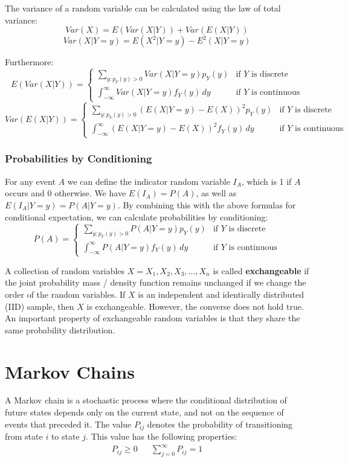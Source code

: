 \documentclass[12pt]{article}
\begin{document}
\newpage
\noindent
The variance of a random variable can be calculated using the law of total variance:
\[ Var(X) = E(Var(X|Y)) + Var(E(X|Y)) \]
\[ Var(X|Y = y) = E(X^2|Y = y) - E^2(X|Y = y) \]

\noindent
Furthermore:
\[ E(Var(X|Y)) = \begin{cases}
    \displaystyle \sum_{y : p_Y(y) > 0} Var(X|Y = y)p_Y(y) & \text{if } Y \text{ is discrete} \\
    \displaystyle \int_{-\infty}^{\infty} Var(X|Y = y)f_Y(y) \,dy & \text{if } Y \text{ is continuous}
\end{cases} \]
\[ Var(E(X|Y)) = \begin{cases}
    \displaystyle \sum_{y : p_Y(y) > 0} (E(X|Y = y) - E(X))^2p_Y(y) & \text{if } Y \text{ is discrete} \\
    \displaystyle \int_{-\infty}^{\infty} (E(X|Y = y) - E(X))^2f_Y(y) \,dy & \text{if } Y \text{ is continuous}
\end{cases} \]

\subsubsection{Probabilities by Conditioning}
For any event $A$ we can define the indicator random variable $I_A$, which is 1 if $A$ occurs and 0 otherwise.
We have $E(I_A) = P(A)$, as well as $E(I_A|Y = y) = P(A|Y = y)$.
By combining this with the above formulas for conditional expectation, we can calculate probabilities by conditioning:
\[ P(A) = \begin{cases}
    \displaystyle \sum_{y : p_Y(y) > 0} P(A | Y = y)p_Y(y) & \text{if } Y \text{ is discrete} \\
    \displaystyle \int_{-\infty}^{\infty} P(A | Y = y)f_Y(y) \,dy & \text{if } Y \text{ is continuous}
\end{cases} \]

\noindent
A collection of random variables $X = X_1, X_2, X_3, ... , X_n$ is called \textbf{exchangeable} if the joint probability mass / density function remains unchanged if we change the order of the random variables.
If $X$ is an independent and identically distributed (IID) sample, then $X$ is exchangeable.
However, the converse does not hold true.
An important property of exchangeable random variables is that they share the same probability distribution.

%
%
\newpage
\section{Markov Chains}
A Markov chain is a stochastic process where the conditional distribution of future states depends only on the current state, and not on the sequence of events that preceded it.
The value $P_{ij}$ denotes the probability of transitioning from state $i$ to state $j$.
This value has the following properties:
\begin{align*}
    \displaystyle P_{ij} \geq 0 && \sum_{j = 0}^\infty P_{ij} = 1
\end{align*}
\end{document}
